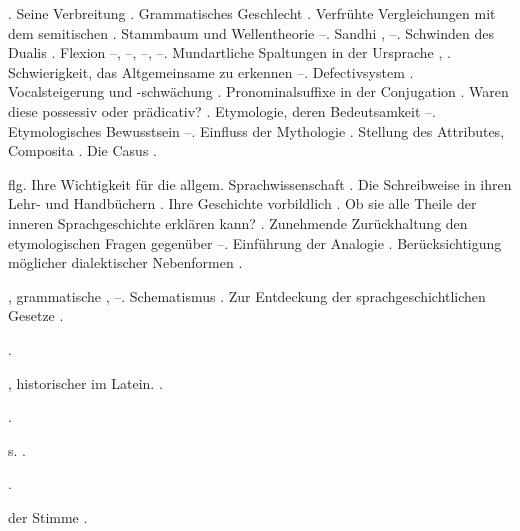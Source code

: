 \begin{register}
. Seine Verbreitung \pageref{sp.142}. Grammatisches Geschlecht \pageref{sp.150}. Verfrühte Vergleichungen mit dem semitischen \pageref{sp.162}. Stammbaum und Wellentheorie \pageref{sp.163}–\pageref{sp.165}.  Sandhi \pageref{sp.198}, \pageref{sp.401}–\pageref{sp.402}. Schwinden des Dualis \pageref{sp.253}. Flexion \pageref{sp.256}–\pageref{sp.257}, \sed{\pageref{sp.251}}\edins{{\textbar}{\textbar}\pageref{sp.351}}–\pageref{sp.354}, \pageref{sp.398}–\pageref{sp.401}, \pageref{sp.435}–\pageref{sp.436}. Mundartliche Spaltungen in der Ursprache \pageref{sp.284}, \pageref{sp.285}. Schwierigkeit, das Altgemeinsame zu erkennen \pageref{sp.293}–\pageref{sp.294}. Defectivsystem \pageref{sp.352}. Vocalsteigerung und -schwächung \pageref{sp.352}. Pronominalsuffixe in der Conjugation \pageref{sp.372}.  Waren diese possessiv oder prädicativ? \pageref{sp.391}. Etymologie, deren Bedeutsamkeit \pageref{sp.395}–\pageref{sp.398}. Etymologisches Bewusstsein \pageref{sp.403}–\pageref{sp.404}.  Einfluss der Mythologie \pageref{sp.447}. Stellung des Attributes, Composita \pageref{sp.457}. Die Casus \pageref{sp.462}.

 \pageref{sp.29} flg. Ihre Wichtigkeit für die allgem. Sprachwissenschaft \pageref{sp.52}. Die Schreibweise in ihren Lehr- und Handbüchern \pageref{sp.108}. Ihre Geschichte vorbildlich \pageref{sp.137}. Ob sie alle Theile der inneren Sprachgeschichte erklären kann? \pageref{sp.170}. Zunehmende Zurückhaltung den etymologischen Fragen gegenüber \pageref{sp.179}–\pageref{sp.180}.  Einführung der Analogie \pageref{sp.210}. Berücksichtigung möglicher dialektischer Nebenformen \pageref{sp.285}.

, grammatische \pageref{sp.89}, \pageref{sp.91}–\pageref{sp.92}. Schematismus \pageref{sp.93}. Zur Entdeckung der sprachgeschichtlichen Gesetze \pageref{sp.170}.

 \pageref{sp.114}.

, historischer im Latein. \pageref{sp.473}.

 \pageref{sp.348}.

 s. .

 \pageref{sp.102}\sed{, \pageref{sp.241}}.

 der Stimme \pageref{sp.314}.


\end{register}
